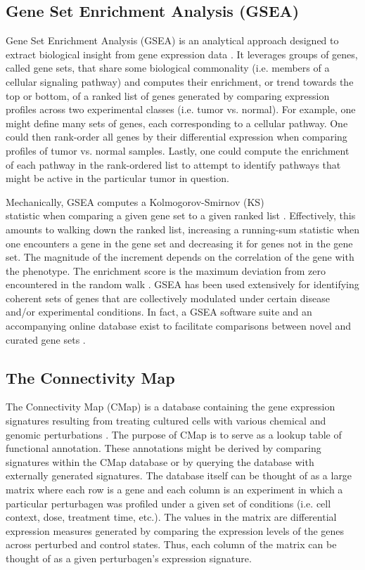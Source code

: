 \documentclass[12pt]{article}
\begin{document}
\subsection{Gene Set Enrichment Analysis (GSEA)}

Gene Set Enrichment Analysis (GSEA) is an analytical approach designed to extract biological insight from gene expression data \cite{subramanian_gene_2005}. It leverages  groups of genes, called gene sets, that share some biological commonality (i.e. members of a cellular signaling pathway) and computes their enrichment, or trend towards the top or bottom, of a ranked list of genes generated by comparing expression profiles across two experimental classes (i.e. tumor vs. normal). For example, one might define many sets of genes, each corresponding to a cellular pathway. One could then rank-order all genes by their differential expression when comparing profiles of tumor vs. normal samples. Lastly, one could compute the enrichment of each pathway in the rank-ordered list to attempt to identify pathways that might be active in the particular tumor in question.

Mechanically, GSEA computes a Kolmogorov-Smirnov (KS)\\
 statistic when comparing a given gene set to a given ranked list \cite{hollander_wolfe_1975}. Effectively, this amounts to walking down the ranked list, increasing a running-sum statistic when one encounters a gene in the gene set and decreasing it for genes not in the gene set. The magnitude of the increment depends on the correlation of the gene with the phenotype. The enrichment score is the maximum deviation from zero encountered in the random walk \cite{subramanian_gene_2005}. GSEA has been used extensively for identifying coherent sets of genes that are collectively modulated under certain disease and/or experimental conditions. In fact, a GSEA software suite and an accompanying online database exist to facilitate comparisons between novel and curated gene sets \cite{msigdb_website}.

\subsection{The Connectivity Map}

The Connectivity Map (CMap) is a database containing the gene expression signatures resulting from treating cultured cells with various chemical and genomic perturbations \cite{lamb_connectivity_2006}. The purpose of CMap is to serve as a lookup table of functional annotation. These annotations might be derived by comparing signatures within the CMap database or by querying the database with externally generated signatures. The database itself can be thought of as a large matrix where each row is a gene and each column is an experiment in which a particular perturbagen was profiled under a given set of conditions (i.e. cell context, dose, treatment time, etc.). The values in the matrix are differential expression measures generated by comparing the expression levels of the genes across perturbed and control states. Thus, each column of the matrix can be thought of as a given perturbagen's expression signature.
\end{document}
